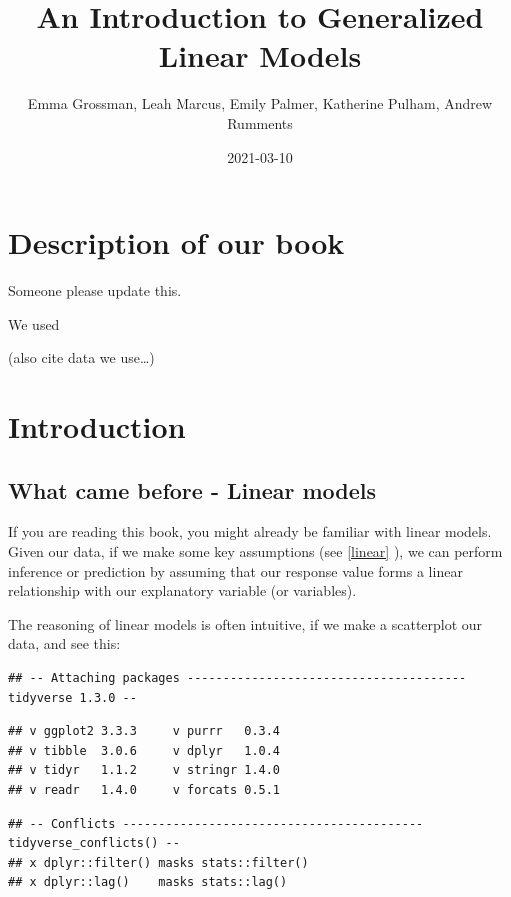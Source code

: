 \documentclass[
]{book}
\title{An Introduction to Generalized Linear Models}
\author{Emma Grossman, Leah Marcus, Emily Palmer, Katherine Pulham, Andrew Rumments}
\date{2021-03-10}
\begin{document}
\maketitle

{
\setcounter{tocdepth}{1}
\tableofcontents
}
\hypertarget{description-of-our-book}{%
\chapter{Description of our book}\label{description-of-our-book}}

Someone please update this.

We used \citep{dunn2018generalized}

(also cite data we use\ldots)

\hypertarget{intro}{%
\chapter{Introduction}\label{intro}}

\hypertarget{what-came-before---linear-models}{%
\section{What came before - Linear models}\label{what-came-before---linear-models}}

If you are reading this book, you might already be familiar with linear models. Given our data, if we make some key assumptions (see \ref{linear} ), we can perform inference or prediction by assuming that our response value forms a linear relationship with our explanatory variable (or variables).

The reasoning of linear models is often intuitive, if we make a scatterplot our data, and see this:

\begin{verbatim}
## -- Attaching packages --------------------------------------- tidyverse 1.3.0 --
\end{verbatim}

\begin{verbatim}
## v ggplot2 3.3.3     v purrr   0.3.4
## v tibble  3.0.6     v dplyr   1.0.4
## v tidyr   1.1.2     v stringr 1.4.0
## v readr   1.4.0     v forcats 0.5.1
\end{verbatim}

\begin{verbatim}
## -- Conflicts ------------------------------------------ tidyverse_conflicts() --
## x dplyr::filter() masks stats::filter()
## x dplyr::lag()    masks stats::lag()
\end{verbatim}
\end{document}
